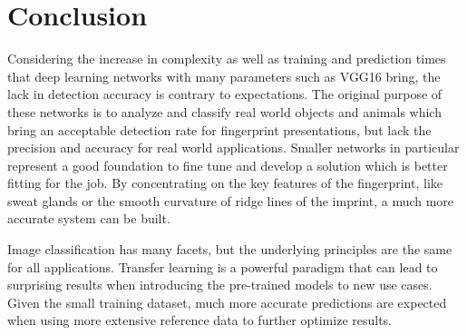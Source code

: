 \section{Conclusion}
Considering the increase in complexity as well as training and prediction times that deep learning networks with many parameters such as VGG16 bring, the lack in detection accuracy is contrary to expectations.
The original purpose of these networks is to analyze and classify real world objects and animals which bring an acceptable detection rate for fingerprint presentations, but lack the precision and accuracy for real world applications.
Smaller networks in particular represent a good foundation to fine tune and develop a solution which is better fitting for the job.
By concentrating on the key features of the fingerprint, like sweat glands or the smooth curvature of ridge lines of the imprint, a much more accurate system can be built.

Image classification has many facets, but the underlying principles are the same for all applications.
Transfer learning is a powerful paradigm that can lead to surprising results when introducing the pre-trained models to new use cases.
Given the small training dataset, much more accurate predictions are expected when using more extensive reference data to further optimize results.

